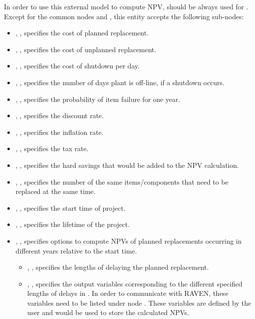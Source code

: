 In order to use this external model to compute NPV, 
should be always used for . Except for the common nodes 
and , this entity accepts the following sub-nodes:
\begin{itemize}
  \item {}, , specifies the cost of planned replacement.
  \item {}, , specifies the cost of unplanned replacement.
  \item {}, , specifies the cost of shutdown per day.
  \item {}, , specifies the number of days
  plant is off-line, if a shutdown occurs.
  \item {}, , specifies the probability
  of item failure for one year.
  \item {}, , specifies the discount rate.
  \item {}, , specifies the inflation rate.
  \item {}, , specifies the tax rate.
  \item {}, , specifies the hard
  savings that would be added to the NPV calculation.
  \item {}, , specifies the number
  of the same items/components that need to be replaced at the same time.
  \item {}, , specifies the
  start time of project.
  \item {}, , specifies the lifetime
  of the project.
  \item {}, , specifies options to compute
  NPVs of planned replacements occurring in different years relative to the start time.
  \begin{itemize}
    \item {}, ,
    specifies the lengths of delaying the planned replacement.
    \item {}, ,
    specifies the output variables corresponding to the different specified lengths of
    delays in . In order to communicate with RAVEN, these
    variables need to be listed under node .
    \nb These variables are defined by the user and would be used to store the
    calculated NPVs.
  \end{itemize}
\end{itemize}

